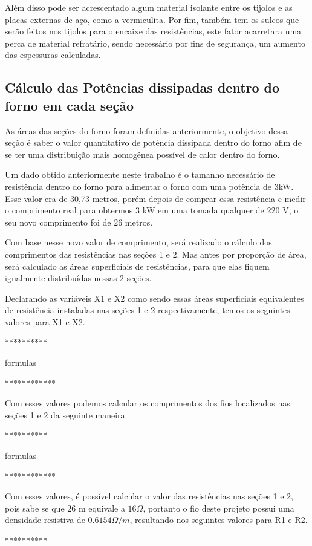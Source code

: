 Além disso pode ser acrescentado algum material isolante entre os tijolos e as placas externas de aço, como a vermiculita.
Por fim, também tem os sulcos que serão feitos nos tijolos para o encaixe das resistências, este fator acarretara uma perca de material refratário, sendo necessário por fins de segurança, um aumento das espessuras calculadas.

\subsection{Cálculo das Potências dissipadas dentro do forno em cada seção}
As áreas das seções do forno foram definidas anteriormente, o objetivo dessa seção é saber o valor quantitativo de potência dissipada dentro do forno afim de se ter uma distribuição mais homogênea possível de calor dentro do forno.

Um dado obtido anteriormente neste trabalho é o tamanho necessário de resistência dentro do forno para alimentar o forno com uma potência de 3kW. Esse valor era de 30,73 metros, porém depois de comprar essa resistência e medir o comprimento real para obtermos 3 kW em uma tomada qualquer de 220 V, o seu novo comprimento foi de 26 metros.

Com base nesse novo valor de comprimento, será realizado o cálculo dos comprimentos das resistências nas seções 1 e 2. Mas antes por proporção de área, será calculado as áreas superficiais de resistências, para que elas fiquem igualmente distribuídas nessas 2 seções.

Declarando as variáveis X1 e X2 como sendo essas áreas superficiais equivalentes de resistência instaladas nas seções 1 e 2 respectivamente, temos os seguintes valores para X1 e X2.

**********

formulas

************

Com esses valores podemos calcular os comprimentos dos fios localizados nas seções 1 e 2 da seguinte maneira.

**********

formulas

************

Com esses valores, é possível calcular o valor das resistências nas seções 1 e 2, pois sabe se que 26 m equivale a $16 \Omega$, portanto o fio deste projeto possui uma densidade resistiva de $0.6154 \Omega /m$, resultando nos seguintes valores para R1 e R2.

**********

